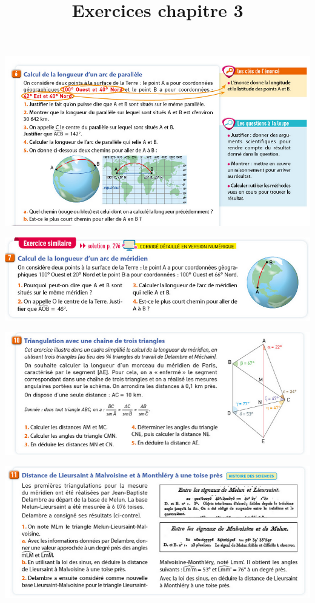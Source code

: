 \documentclass[10pt]{article}
\newcommand{\titreActivite}{Exercices chapitre 3} %
\newcommand{\myscale}{0.57}
\begin{document}
\date{}
\title{\titreActivite}
\maketitle %


\begin{center}
	\includegraphics[scale=\myscale]{assets/6.png}
	\vspace{10pt}

	\includegraphics[scale=\myscale]{assets/7.png}



	\includegraphics[scale=\myscale]{assets/10.png}

	\includegraphics[scale=\myscale]{assets/11.png}


\end{center}
\end{document}
